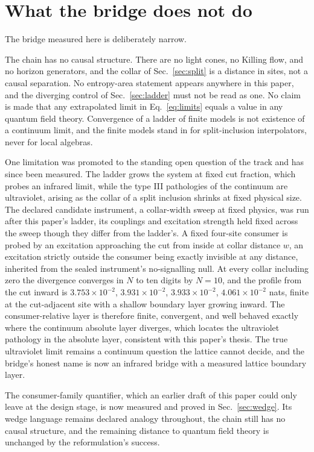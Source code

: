 \documentclass[aps,prd,reprint,nofootinbib,longbibliography]{revtex4-2}
\begin{document}
\section{What the bridge does not do}
\label{sec:nonclaims}

The bridge measured here is deliberately narrow.

The chain has no causal structure.  There are no light cones, no Killing
flow, and no horizon generators, and the collar of Sec.~\ref{sec:split}
is a distance in sites, not a causal separation.  No entropy-area
statement appears anywhere in this paper, and the diverging control of
Sec.~\ref{sec:ladder} must not be read as one.  No claim is made that any
extrapolated limit in Eq.~\eqref{eq:limits} equals a value in any quantum
field theory.  Convergence of a ladder of finite models is not existence
of a continuum limit, and the finite models stand in for split-inclusion
interpolators, never for local algebras.

One limitation was promoted to the standing open question of the
track and has since been measured.  The ladder grows the system at
fixed cut fraction, which probes an infrared limit, while the type
III pathologies of the continuum are ultraviolet, arising as the
collar of a split inclusion shrinks at fixed physical size.  The
declared candidate instrument, a collar-width sweep at fixed
physics, was run after this paper's ladder, its couplings and
excitation strength held fixed across the sweep though they differ
from the ladder's.  A fixed four-site
consumer is probed by an excitation approaching the cut from inside
at collar distance $w$, an excitation strictly outside the consumer
being exactly invisible at any distance, inherited from the sealed
instrument's no-signalling null.  At every collar
including zero the divergence converges in $N$ to ten digits by
$N = 10$, and the profile from the cut inward is $3.753\times
10^{-2}$, $3.931\times 10^{-2}$, $3.933\times 10^{-2}$,
$4.061\times 10^{-2}$ nats, finite at the cut-adjacent site with a
shallow boundary layer growing inward.  The consumer-relative layer
is therefore finite, convergent, and well behaved exactly where the
continuum absolute layer diverges, which locates the ultraviolet
pathology in the absolute layer, consistent with this paper's
thesis.  The true ultraviolet limit remains a continuum question the
lattice cannot decide, and the bridge's honest name is now an
infrared bridge with a measured lattice boundary layer.

The consumer-family quantifier, which an earlier draft of this paper
could only leave at the design stage, is now measured and proved in
Sec.~\ref{sec:wedge}.  Its wedge language remains declared analogy
throughout, the chain still has no causal structure, and the
remaining distance to quantum field theory is unchanged by the
reformulation's success.
\end{document}

